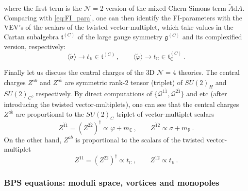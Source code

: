 \documentclass[12pt,a4paper]{article}
\renewcommand{\(}{\left(}
\renewcommand{\)}{\right)}
\renewcommand{\(}{\left(}
\renewcommand{\)}{\right)}
\begin{document}
where the first term is the $\mathcal{N}=2$ version of the mixed Chern-Simons term $\tilde{A}\mathrm{d}A$.
Comparing with \eqref{eq:FI_para}, one can then identify the FI-parameters with the VEV's of the scalars of the twisted vector-multiplet, which take values in the Cartan subalgebra $\mathfrak{t}^{(C)}$ of the large gauge symmetry $\mathfrak{g}^{(C)}$ and its complexified version, respectively:
\begin{equation}
\langle\tilde{\sigma}\rangle\rightarrow t_{\mathbb{R}}\in \mathfrak{t}^{(C)}\,,\qquad \langle\tilde{\varphi}\rangle\rightarrow t_{\mathbb{C}}\in\mathfrak{t}^{(C)}_{\mathbb{C}}\,.
\end{equation}

\medskip 
	
Finally let us discuss the central charges of the 3D $\mathcal{N}=4$ theories. 
The central charges $Z^{ab}$ and $Z^{\dot{a}\dot{b}}$ are symmetric rank-2 tensor (triplet) of $SU(2)_H$ and $SU(2)_C$, respectively. 
By direct computations of  $\{\mathcal{Q}^{1\dot{1}},\mathcal{Q}^{2\dot{1}}\}$ and etc (after introducing the twisted vector-multiplets), one can see that the central charges $Z^{\dot{a}\dot{b}}$ are proportional to the $SU(2)_C$ triplet of vector-multiplet scalars
\begin{equation}
Z^{\dot{1}\dot{1}}=(Z^{\dot{2}\dot{2}})^\dag\propto \varphi+m_{\mathbb{C}}\,,\qquad Z^{\dot{1}\dot{2}}\propto \sigma+m_{\mathbb{R}}\,.
\end{equation}
On the other hand, $Z^{ab}$ is proportional to the scalars of the twisted vector-multiplet
\begin{equation}
Z^{11}=(Z^{22})^\dag\propto t_{\mathbb{C}}\,,\qquad Z^{12}\propto t_{\mathbb{R}}\,.
\end{equation}
	
\subsubsection{BPS equations: moduli space, vortices and monopoles}
\end{document}
